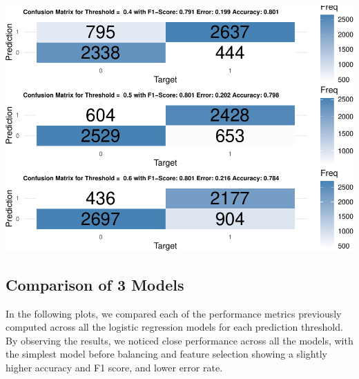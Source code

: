 \documentclass[
]{article}
\begin{document}
\includegraphics{Rain_Australia_files/figure-latex/selected model-1.pdf}

\hypertarget{comparison-of-3-models}{%
\subsection{Comparison of 3 Models}\label{comparison-of-3-models}}

In the following plots, we compared each of the performance metrics
previously computed across all the logistic regression models for each
prediction threshold. By observing the results, we noticed close
performance across all the models, with the simplest model before
balancing and feature selection showing a slightly higher accuracy and
F1 score, and lower error rate.
\end{document}
